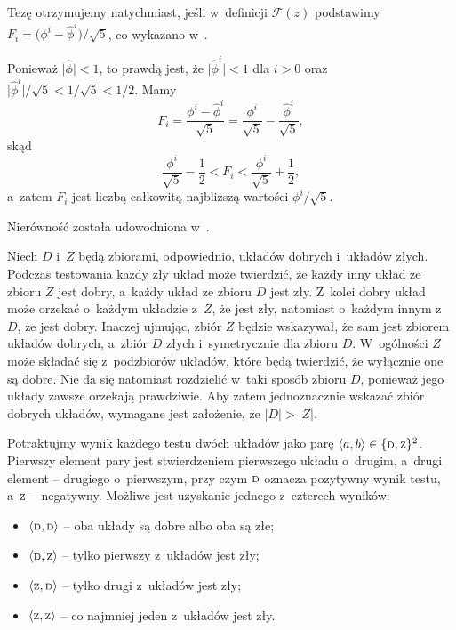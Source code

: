 \subproblem %
Tezę otrzymujemy natychmiast, jeśli w~definicji $\mathcal{F}(z)$ podstawimy $F_i=\bigl(\phi^i-\widehat\phi^i\bigr)/\sqrt{5}$, co wykazano w~.

\subproblem %
Ponieważ $\bigl|\widehat\phi\bigr|<1$, to prawdą jest, że $\bigl|\widehat\phi^i\bigr|<1$ dla $i>0$ oraz $\bigl|\widehat\phi^i\bigr|/\sqrt{5}<1/\sqrt{5}<1/2$. Mamy
\[
	F_i = \frac{\phi^i-\widehat\phi^i}{\sqrt{5}} = \frac{\phi^i}{\sqrt{5}}-\frac{\widehat\phi^i}{\sqrt{5}},
\]
skąd
\[
	\frac{\phi^i}{\sqrt{5}}-\frac{1}{2} < F_i < \frac{\phi^i}{\sqrt{5}}+\frac{1}{2},
\]
a~zatem $F_i$ jest liczbą całkowitą najbliższą wartości $\phi^i/\sqrt{5}$.

\subproblem %
Nierówność została udowodniona w~.


\subproblem %
Niech $D$ i~$Z$ będą zbiorami, odpowiednio, układów dobrych i~układów złych. Podczas testowania każdy zły układ może twierdzić, że każdy inny układ ze zbioru $Z$ jest dobry, a~każdy układ ze zbioru $D$ jest zły. Z~kolei dobry układ może orzekać o~każdym układzie z~$Z$, że jest zły, natomiast o~każdym innym z~$D$, że jest dobry. Inaczej ujmując, zbiór $Z$ będzie wskazywał, że sam jest zbiorem układów dobrych, a~zbiór $D$ złych i~symetrycznie dla zbioru $D$. W~ogólności $Z$ może składać się z~podzbiorów układów, które będą twierdzić, że wyłącznie one są dobre. Nie da się natomiast rozdzielić w~taki sposób zbioru $D$, ponieważ jego układy zawsze orzekają prawdziwie. Aby zatem jednoznacznie wskazać zbiór dobrych układów, wymagane jest założenie, że $|D|>|Z|$.

\subproblem %
Potraktujmy wynik każdego testu dwóch układów jako parę $\langle a,b\rangle\in\{{\scriptstyle\rm D},{\scriptstyle\rm Z}\}^2$. Pierwszy element pary jest stwierdzeniem pierwszego układu o~drugim, a~drugi element -- drugiego o~pierwszym, przy czym ${\scriptstyle\rm D}$ oznacza pozytywny wynik testu, a~${\scriptstyle\rm Z}$ -- negatywny. Możliwe jest uzyskanie jednego z~czterech wyników:
\begin{itemize}
	\item $\langle{\scriptstyle\rm D},{\scriptstyle\rm D}\rangle$ -- oba układy są dobre albo oba są złe;
	\item $\langle{\scriptstyle\rm D},{\scriptstyle\rm Z}\rangle$ -- tylko pierwszy z~układów jest zły;
	\item $\langle{\scriptstyle\rm Z},{\scriptstyle\rm D}\rangle$ -- tylko drugi z~układów jest zły;
	\item $\langle{\scriptstyle\rm Z},{\scriptstyle\rm Z}\rangle$ -- co najmniej jeden z~układów jest zły.
\end{itemize}

